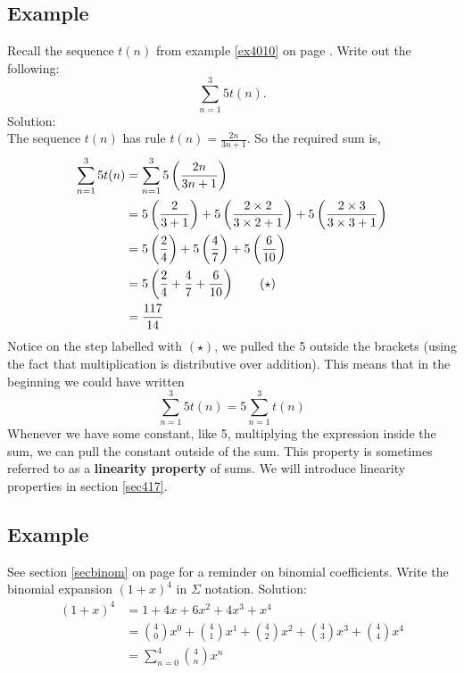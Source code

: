 \subsection{Example} \label{ex413}
Recall the sequence $t(n)$ from example \ref{ex4010} on page \pageref{ex4010}. Write out the following:
\[
\sum_{n=1}^3 5t(n).
\]
Solution: \\
The sequence $t(n)$ has rule $t(n) = \frac{2n}{3n+1}$. So the required sum is,
\begin{align*}
\sum_{n=1}^3 5t(n) & = \sum_{n=1}^3 5\left(\frac{2n}{3n+1}\right) \\	
				    & = 5\left(\frac{2}{3+1}\right) + 5\left(\frac{2\times2}{3\times2+1}\right) + 5\left(\frac{2\times3}{3\times3+1}\right) \\
				    & = 5\left(\frac{2}{4}\right) + 5\left(\frac{4}{7}\right) + 5\left(\frac{6}{10}\right) \\
				    & = 5\left(\frac{2}{4} + \frac{4}{7} + \frac{6}{10}\right) \tag{$\star$} \\
				    & = \frac{117}{14}
\end{align*}
Notice on the step labelled with $(\star)$, we pulled the 5 outside the brackets (using the fact that multiplication is distributive over addition). This means that in the beginning we could have written
\[
\sum_{n=1}^3 5t(n) = 5 \sum_{n=1}^3 t(n) 
\]
Whenever we have some constant, like 5, multiplying the expression inside the sum, we can pull the constant outside of the sum. This property is sometimes referred to as a \textbf{linearity property} of sums. We will introduce linearity properties in section \ref{sec417}.


\subsection{Example}
See section \ref{secbinom} on page \pageref{secbinom} for a reminder on binomial coefficients. Write the binomial expansion $(1+x)^4$ in $\Sigma$ notation. Solution:
\begin{align*}
(1+x)^4 & = 1 + 4x + 6x^2 + 4x^3 + x^4 \\
& = \binom{4}{0}x^0 + \binom{4}{1}x^1 + \binom{4}{2}x^2 + \binom{4}{3}x^3 + \binom{4}{4}x^4 \\
& = \sum_{n = 0}^4 \binom{4}{n}x^n
\end{align*}

